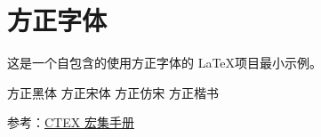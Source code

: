 \documentclass[fontset=founder]{ctexart}
\begin{document}
\section*{方正字体}

这是一个自包含的使用方正字体的 \LaTeX 项目最小示例。

\heiti 方正黑体
\songti 方正宋体
\fangsong 方正仿宋
\kaishu 方正楷书

参考：\href{https://texdoc.org/serve/ctex/0#page=5.96}{CTEX 宏集手册}
\end{document}
